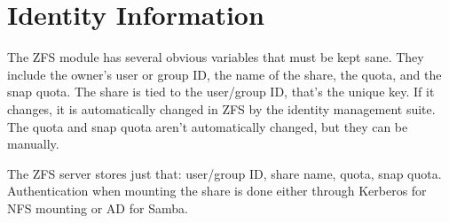 \section{Identity Information}

The ZFS module has several obvious variables that must be kept sane. They include the owner's user or group ID, the name of the share, the quota, and the snap quota. The share is tied to the user/group ID, that's the unique key. If it changes, it is automatically changed in ZFS by the identity management suite. The quota and snap quota aren't automatically changed, but they can be manually. 

The ZFS server stores just that: user/group ID, share name, quota, snap quota. Authentication when mounting the share is done either through Kerberos for NFS mounting or AD for Samba. 
